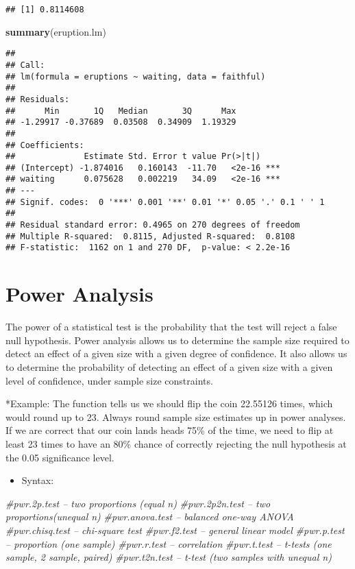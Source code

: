 \documentclass[]{article}
\newenvironment{Shaded}{\begin{snugshade}}{\end{snugshade}}
\newcommand{\CommentTok}[1]{\textcolor[rgb]{0.56,0.35,0.01}{\textit{#1}}}
\newcommand{\KeywordTok}[1]{\textcolor[rgb]{0.13,0.29,0.53}{\textbf{#1}}}
\newcommand{\NormalTok}[1]{#1}
\providecommand{\tightlist}{%
  \setlength{\itemsep}{0pt}\setlength{\parskip}{0pt}}
\begin{document}
\begin{verbatim}
## [1] 0.8114608
\end{verbatim}

\begin{Shaded}
\begin{Highlighting}[]
\KeywordTok{summary}\NormalTok{(eruption.lm)}
\end{Highlighting}
\end{Shaded}

\begin{verbatim}
## 
## Call:
## lm(formula = eruptions ~ waiting, data = faithful)
## 
## Residuals:
##      Min       1Q   Median       3Q      Max 
## -1.29917 -0.37689  0.03508  0.34909  1.19329 
## 
## Coefficients:
##              Estimate Std. Error t value Pr(>|t|)    
## (Intercept) -1.874016   0.160143  -11.70   <2e-16 ***
## waiting      0.075628   0.002219   34.09   <2e-16 ***
## ---
## Signif. codes:  0 '***' 0.001 '**' 0.01 '*' 0.05 '.' 0.1 ' ' 1
## 
## Residual standard error: 0.4965 on 270 degrees of freedom
## Multiple R-squared:  0.8115, Adjusted R-squared:  0.8108 
## F-statistic:  1162 on 1 and 270 DF,  p-value: < 2.2e-16
\end{verbatim}

\hypertarget{power-analysis}{%
\section{Power Analysis}\label{power-analysis}}

The power of a statistical test is the probability that the test will
reject a false null hypothesis. Power analysis allows us to determine
the sample size required to detect an effect of a given size with a
given degree of confidence. It also allows us to determine the
probability of detecting an effect of a given size with a given level of
confidence, under sample size constraints.

*Example: The function tells us we should flip the coin 22.55126 times,
which would round up to 23. Always round sample size estimates up in
power analyses. If we are correct that our coin lands heads 75\% of the
time, we need to flip at least 23 times to have an 80\% chance of
correctly rejecting the null hypothesis at the 0.05 significance level.

\begin{itemize}
\tightlist
\item
  Syntax:
\end{itemize}

\begin{Shaded}
\begin{Highlighting}[]
\CommentTok{#pwr.2p.test -- two proportions (equal n)}
\CommentTok{#pwr.2p2n.test -- two proportions(unequal n)}
\CommentTok{#pwr.anova.test -- balanced one-way ANOVA}
\CommentTok{#pwr.chisq.test  -- chi-square test}
\CommentTok{#pwr.f2.test -- general linear model}
\CommentTok{#pwr.p.test -- proportion (one sample)}
\CommentTok{#pwr.r.test -- correlation}
\CommentTok{#pwr.t.test -- t-tests (one sample, 2 sample, paired)}
\CommentTok{#pwr.t2n.test   -- t-test (two samples with unequal n)}
\end{Highlighting}
\end{Shaded}
\end{document}
